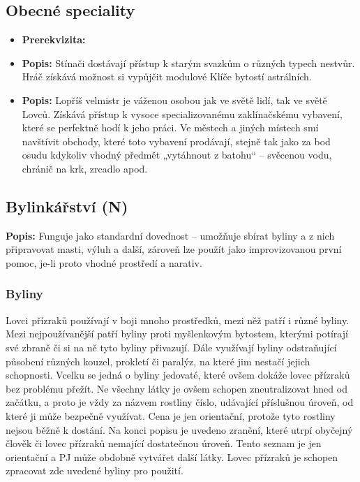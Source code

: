 \documentclass[../main.tex]{subfiles}
\begin{document}
\subsection{Obecné speciality}
\label{sec:lopr-obec}

\begin{specialita}[Grimoáry, I]
\begin{itemize}
	\item \textbf{Prerekvizita:} 
	\item \textbf{Popis:} Stínači dostávají přístup k starým svazkům o různých typech nestvůr. Hráč získává možnost si vypůjčit modulové Klíče bytostí astrálních.
\end{itemize}
\end{specialita}

\begin{specialita}
\begin{itemize}
	\item \textbf{Popis:} Lopříš velmistr je váženou osobou jak ve světě lidí, tak ve světě Lovců. Získává přístup k vysoce specializovanému zaklínačskému vybavení, které se perfektně hodí k jeho práci. Ve městech a jiných místech smí navštívit obchody, které toto vybavení prodávají, stejně tak jako za bod osudu kdykoliv vhodný předmět „vytáhnout z batohu“ – svěcenou vodu, chránič na krk, zrcadlo apod.
\end{itemize}
\end{specialita}


\subsection{Bylinkářství (N)}
\label{sec:lopr-byliny}

\textbf{Popis:} Funguje jako standardní dovednost  – umožňuje sbírat byliny a z nich připravovat masti, výluh a další, zároveň lze použít jako improvizovanou první pomoc, je-li proto vhodné prostředí a narativ.

\subsubsection{Byliny}

Lovci přízraků používají v boji mnoho prostředků, mezi něž patří i různé byliny. Mezi nejpoužívanější patří byliny proti myšlenkovým bytostem, kterými potírají své zbraně či si na ně tyto byliny přivazují. Dále využívají byliny odstraňující působení různých kouzel, prokletí či paralýz, na které jim nestačí jejich schopnosti. Vcelku se jedná o byliny jedovaté, které ovšem dokáže lovec přízraků bez problému přežít. Ne všechny látky je ovšem schopen zneutralizovat hned od začátku, a proto je vždy za názvem rostliny číslo, udávající příslušnou úroveň, od které ji může bezpečně využívat. Cena je jen orientační, protože tyto rostliny nejsou běžně k dostání. Na konci popisu je uvedeno zranění, které utrpí obyčejný člověk či lovec přízraků nemající dostatečnou úroveň. Tento seznam je jen orientační a PJ může obdobně vytvářet další látky. Lovec přízraků je schopen zpracovat zde uvedené byliny pro použití.
\end{document}
